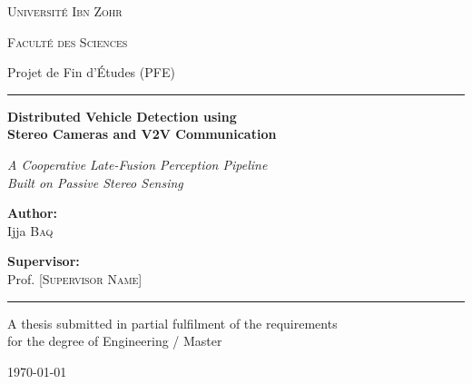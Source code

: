\begin{titlepage}
\centering
\thispagestyle{empty}

{\scshape\large Université Ibn Zohr\par}
{\scshape Faculté des Sciences\par}
\vspace{0.4cm}
{\large Projet de Fin d'Études (PFE)\par}
\vspace{0.2cm}
\rule{\textwidth}{0.4pt}

\vfill

{\Huge\bfseries Distributed Vehicle Detection using\\[0.35em]
Stereo Cameras and V2V Communication\par}
\vspace{0.8cm}
{\large\itshape A Cooperative Late-Fusion Perception Pipeline\\
Built on Passive Stereo Sensing\par}

\vfill

\begin{minipage}{0.45\textwidth}
\begin{flushleft}\large
\textbf{Author:}\\
Ijja \textsc{Baq}
\end{flushleft}
\end{minipage}
\hfill
\begin{minipage}{0.45\textwidth}
\begin{flushright}\large
\textbf{Supervisor:}\\
Prof. \textsc{[Supervisor Name]}
\end{flushright}
\end{minipage}

\vfill

\rule{\textwidth}{0.4pt}
{\large A thesis submitted in partial fulfilment of the requirements\\
for the degree of Engineering / Master\par}
\vspace{0.6cm}
{\large \today\par}

\end{titlepage}
